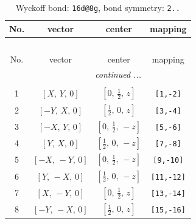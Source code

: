 \documentclass[fleqn,8pt]{jsarticle}
\begin{document}
\begin{longtable}{cccc}
\caption{Wyckoff bond: {\tt 16d@8g}, bond symmetry: {\tt 2..}}
 \\
 \hline \hline
No. & vector & center & mapping \\ \hline \endfirsthead

\multicolumn{3}{l}{\tablename\ \thetable{}} \\
 \hline \hline
No. & vector & center & mapping \\ \hline \endhead

 \hline \hline
\multicolumn{3}{r}{\footnotesize\it continued ...} \\ \endfoot

 \hline \hline
\multicolumn{3}{r}{} \\ \endlastfoot

1 & $\left[ X,\, Y,\, 0 \right]$ & $\left[ 0,\, \frac{1}{2},\, z \right]$ & {\tt [1,-2]} \\ \hline
2 & $\left[ - Y,\, X,\, 0 \right]$ & $\left[ \frac{1}{2},\, 0,\, z \right]$ & {\tt [3,-4]} \\ \hline
3 & $\left[ - X,\, Y,\, 0 \right]$ & $\left[ 0,\, \frac{1}{2},\, - z \right]$ & {\tt [5,-6]} \\ \hline
4 & $\left[ Y,\, X,\, 0 \right]$ & $\left[ \frac{1}{2},\, 0,\, - z \right]$ & {\tt [7,-8]} \\ \hline
5 & $\left[ - X,\, - Y,\, 0 \right]$ & $\left[ 0,\, \frac{1}{2},\, - z \right]$ & {\tt [9,-10]} \\ \hline
6 & $\left[ Y,\, - X,\, 0 \right]$ & $\left[ \frac{1}{2},\, 0,\, - z \right]$ & {\tt [11,-12]} \\ \hline
7 & $\left[ X,\, - Y,\, 0 \right]$ & $\left[ 0,\, \frac{1}{2},\, z \right]$ & {\tt [13,-14]} \\ \hline
8 & $\left[ - Y,\, - X,\, 0 \right]$ & $\left[ \frac{1}{2},\, 0,\, z \right]$ & {\tt [15,-16]} \\
\end{longtable}
\renewcommand{\arraystretch}{1.2}
\end{document}

